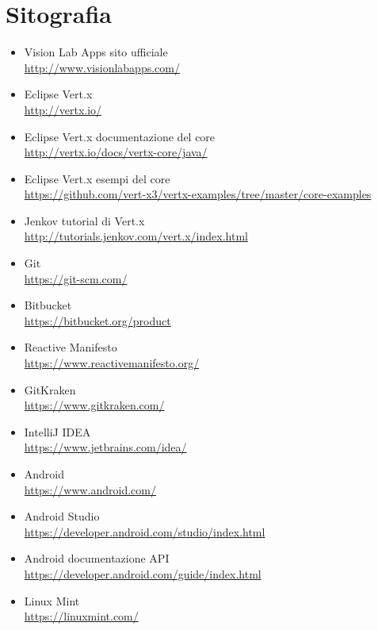 \chapter*{Sitografia}
\begin{itemize}
  \item Vision Lab Apps sito ufficiale \\ \url{http://www.visionlabapps.com/}
  \item Eclipse Vert.x \\ \url{http://vertx.io/}
  \item Eclipse Vert.x documentazione del core \\ \url{http://vertx.io/docs/vertx-core/java/}
  \item Eclipse Vert.x esempi del core \\ \url{https://github.com/vert-x3/vertx-examples/tree/master/core-examples}
  \item Jenkov tutorial di Vert.x \\ \url{http://tutorials.jenkov.com/vert.x/index.html}
  \item Git \\ \url{https://git-scm.com/}
  \item Bitbucket \\ \url{https://bitbucket.org/product}
  \item Reactive Manifesto \\ \url{https://www.reactivemanifesto.org/}
  \item GitKraken \\ \url{https://www.gitkraken.com/}
  \item IntelliJ IDEA \\ \url{https://www.jetbrains.com/idea/}
  \item Android \\ \url{https://www.android.com/}
  \item Android Studio \\ \url{https://developer.android.com/studio/index.html}
  \item Android documentazione API \\ \url{https://developer.android.com/guide/index.html}
  \item Linux Mint \\ \url{https://linuxmint.com/}
\end{itemize}
